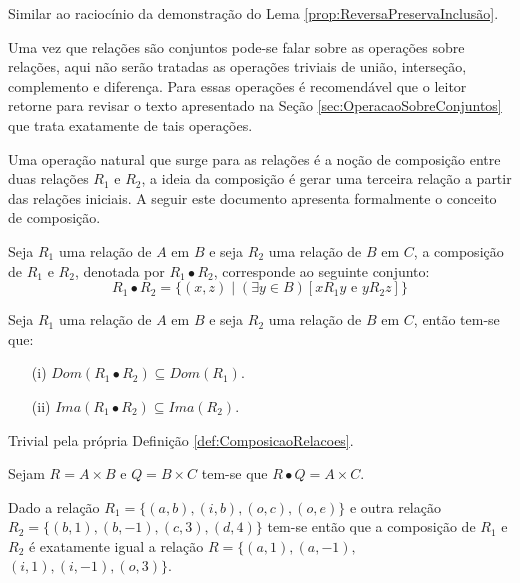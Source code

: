 \begin{prova}
	Similar ao raciocínio da demonstração do Lema \ref{prop:ReversaPreservaInclusão}.
\end{prova}

Uma vez que relações são conjuntos pode-se falar sobre as operações sobre relações, aqui não serão tratadas as operações triviais de união, interseção, complemento e diferença. Para essas operações é recomendável que o leitor retorne para revisar o texto apresentado na Seção \ref{sec:OperacaoSobreConjuntos} que trata exatamente de tais operações. 

Uma operação natural que surge para as relações é a noção de composição entre duas relações $R_1$ e $R_2$, a ideia da composição é gerar uma terceira relação a partir das relações iniciais. A seguir este documento apresenta formalmente o conceito de composição.

\begin{definicao}\label{def:ComposicaoRelacoes}
	Seja $R_1$ uma relação de $A$ em $B$ e seja $R_2$ uma relação de $B$ em $C$, a composição de $R_1$ e $R_2$, denotada por $R_1 \bullet R_2$, corresponde ao seguinte conjunto:
	$$R_1 \bullet R_2 = \{(x, z) \mid (\exists y \in B)[x\mathrel{R_1}y \text{ e } y\mathrel{R_2}z] \}$$
\end{definicao}

\begin{lema}
  Seja $R_1$ uma relação de $A$ em $B$ e seja $R_2$ uma relação de $B$ em $C$, então tem-se que:
	\begin{itemize}
		\item[(i)] $Dom(R_1 \bullet R_2) \subseteq Dom(R_1)$.
		\item[(ii)] $Ima(R_1 \bullet R_2) \subseteq Ima(R_2)$.
	\end{itemize}
\end{lema}

\begin{prova}
	Trivial pela própria Definição \ref{def:ComposicaoRelacoes}.
\end{prova}

\begin{exemplo}
	Sejam $R = A \times B$ e $Q = B \times C$ tem-se que $R \bullet Q = A \times C$.
\end{exemplo}

\begin{exemplo}
	Dado a relação $R_1 = \{(a, b), (i, b), (o, c), (o, e)\}$ e outra relação $R_2 = \{(b, 1), (b, -1), (c, 3), (d, 4)\}$ tem-se então que a composição de $R_1$ e $R_2$ é exatamente igual a relação $R = \{(a, 1), (a, -1),$ $(i, 1), (i, -1), (o, 3)\}$.
\end{exemplo}

